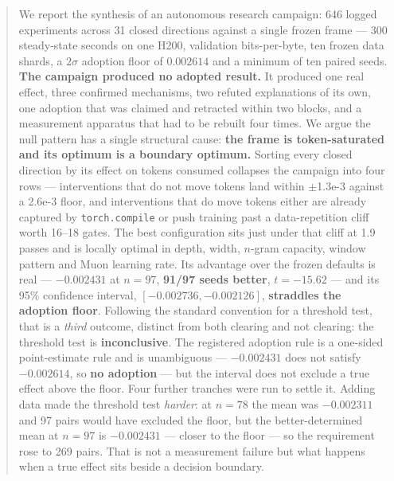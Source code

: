 \documentclass{article}
\begin{document}
\printAffiliationsAndNotice{}

\begin{abstract}
We report the synthesis of an autonomous research campaign: 646 logged experiments across 31 closed directions against a single frozen frame --- 300 steady-state seconds on one H200, validation bits-per-byte, ten frozen data shards, a $2\sigma$ adoption floor of $0.002614$ and a minimum of ten paired seeds. \textbf{The campaign produced no adopted result.} It produced one real effect, three confirmed mechanisms, two refuted explanations of its own, one adoption that was claimed and retracted within two blocks, and a measurement apparatus that had to be rebuilt four times. We argue the null pattern has a single structural cause: \textbf{the frame is token-saturated and its optimum is a boundary optimum.} Sorting every closed direction by its effect on tokens consumed collapses the campaign into four rows --- interventions that do not move tokens land within $\pm$1.3e-3 against a 2.6e-3 floor, and interventions that do move tokens either are already captured by \texttt{torch.compile} or push training past a data-repetition cliff worth 16--18 gates. The best configuration sits just under that cliff at 1.9 passes and is locally optimal in depth, width, $n$-gram capacity, window pattern and Muon learning rate. Its advantage over the frozen defaults is real --- $-0.002431$ at $n{=}97$, \textbf{91/97 seeds better}, $t=-15.62$ --- and its 95\% confidence interval, $[-0.002736, -0.002126]$, \textbf{straddles the adoption floor}. Following the standard convention for a threshold test, that is a \emph{third} outcome, distinct from both clearing and not clearing: the threshold test is \textbf{inconclusive}. The registered adoption rule is a one-sided point-estimate rule and is unambiguous --- $-0.002431$ does not satisfy $-0.002614$, so \textbf{no adoption} --- but the interval does not exclude a true effect above the floor. Four further tranches were run to settle it. Adding data made the threshold test \emph{harder}: at $n{=}78$ the mean was $-0.002311$ and 97 pairs would have excluded the floor, but the better-determined mean at $n{=}97$ is $-0.002431$ --- closer to the floor --- so the requirement rose to 269 pairs. That is not a measurement failure but what happens when a true effect sits beside a decision boundary.
\end{abstract}
\end{document}
